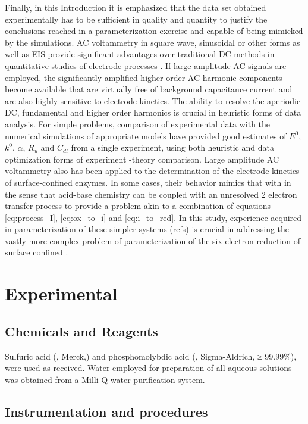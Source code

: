 \documentclass[a4paper, 12pt]{article}
\begin{document}
Finally, in this Introduction it is emphasized that the data set obtained 
experimentally has to be sufficient in quality and quantity to justify the 
conclusions reached in a parameterization exercise and capable of being mimicked 
by the simulations. AC voltammetry in square wave, sinusoidal or other forms as 
well as EIS provide significant advantages over traditional DC methods in 
quantitative studies of electrode processes 
\cite{bond2015integrated,guo2015fourier}. If large amplitude AC signals are 
employed, the significantly amplified higher-order AC harmonic components become 
available that are virtually free of background capacitance current and are also 
highly sensitive to electrode kinetics. The ability to resolve the aperiodic DC, 
fundamental and higher order harmonics is crucial in heuristic forms of data 
analysis. For simple problems, comparison of experimental data with the 
numerical simulations of appropriate models have provided  good estimates of 
$E^0$,  $k^0$, $\alpha$, $R_u$ and $C_{dl}$ from a single experiment, using  
both heuristic and data optimization forms of experiment -theory comparison.  
Large amplitude AC voltammetry also has been applied to the determination of the 
electrode kinetics of surface-confined enzymes. In some cases, their behavior  
mimics that   with  in the sense  that  acid-base chemistry   
can be coupled with an unresolved 2 electron transfer process to provide a 
problem akin to a combination of equations \ref{eq:process_I}, \ref{eq:ox_to_i} 
and \ref{eq:i_to_red}. In this study, experience acquired in parameterization of 
these simpler systems (refs) is crucial in addressing the vastly more complex 
problem of parameterization of the six electron reduction of surface confined 
.

\section{Experimental}

\subsection{Chemicals and Reagents}


Sulfuric acid (, Merck,) and phosphomolybdic acid (, 
Sigma-Aldrich, ≥ 99.99\%), were used as received. Water employed for preparation 
of all aqueous solutions was obtained from a Milli-Q water purification system.

\subsection{Instrumentation and procedures}
\end{document}
